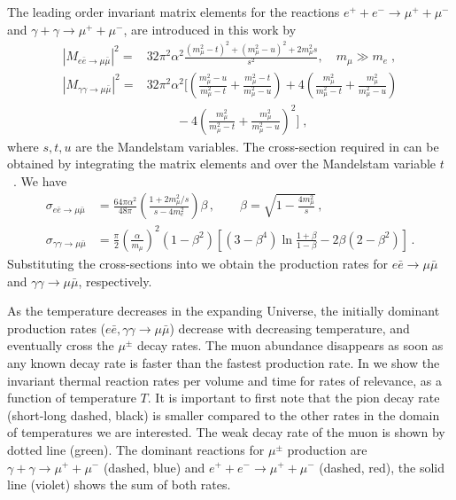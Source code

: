 The leading order invariant matrix elements for the reactions $e^++e^-\to\mu^++\mu^-$ and $\gamma+\gamma\to\mu^++\mu^-$, are introduced in this work by~\cite{Kuznetsova:2008jt}
\begin{align}\label{Mee}
|M_{e\bar e\to\mu\bar\mu}|^2=&32\pi^2\alpha^2\frac{(m_\mu^2-t)^2+(m_\mu^2-u)^2+2m_\mu^2s}{s^2},\quad m_\mu\gg m_e\;,\\[0.2cm]
\label{Mgg}
|M_{\gamma\gamma\to\mu\bar\mu}|^2=&32\pi^2\alpha^2\bigg[\left(\frac{m_\mu^2-u}{m_\mu^2-t}+\frac{m_\mu^2-t}{m_\mu^2-u}\right)+4\left(\frac{m_\mu^2}{m_\mu^2-t}+\frac{m_\mu^2}{m^2_\mu-u}\right)\\[0.1cm] \nonumber
&\hspace{1cm}-4\left(\frac{m_\mu^2}{m^2_\mu-t}+\frac{m^2_\mu}{m^2_\mu-u}\right)^2\bigg]\;,
\end{align}
 where $s, t, u$ are the Mandelstam variables. The cross-section required in  can be obtained by integrating the matrix elements  and  over the Mandelstam variable $t$~\cite{Kuznetsova:2010pi}. We have
\begin{align}
\sigma_{e\bar e\to\mu\bar\mu} 
&=\frac{64\pi\alpha^2}{48\pi}\left(\frac{1+2m^2_\mu/s}{s-4m_e^2}\right)\beta\,,\qquad 
\beta =\sqrt{1-\frac{4m^2_\mu}{s}}\, ,\\
\sigma_{\gamma\gamma\to\mu\bar\mu}
 &=\frac{\pi}{2}\left(\frac{\alpha}{m_\mu}\right)^2(1-\beta^2)\left[(3-\beta^4)\ln\frac{1+\beta}{1-\beta}-2\beta(2-\beta^2)\right] \,.
\end{align}
Substituting the cross-sections into  we obtain the production rates for $e\bar e\to\mu\bar\mu$ and $\gamma\gamma\to\mu\bar\mu$, respectively.

As the temperature decreases in the expanding Universe, the initially dominant production rates ($e\bar e,\gamma\gamma\to\mu\bar\mu$) decrease with decreasing temperature, and eventually cross the $\mu^\pm$ decay rates. The muon abundance disappears as soon as any known decay rate is faster than the fastest production rate. In  we show the invariant thermal reaction rates per volume and time for rates of relevance, as a function of temperature $T$. It is important to first note that the pion decay rate (short-long dashed, black) is smaller compared to the other rates in the domain of temperatures we are interested. The weak decay rate of the muon is shown by dotted line (green). The dominant reactions for $\mu^\pm$ production are ${\gamma+\gamma\to\mu^++\mu^-}$ (dashed, blue) and $e^++e^-\to\mu^++\mu^-$ (dashed, red), the solid line (violet) shows the sum of both rates. 

